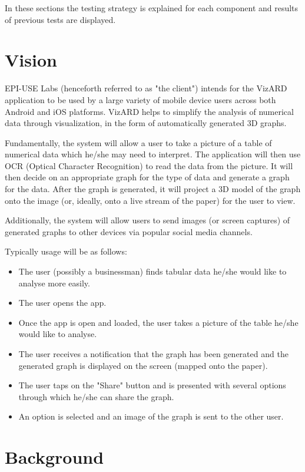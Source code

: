 \documentclass[a4paper,12pt]{article}
\begin{document}
In these sections the testing strategy is explained for each component and results of previous tests are displayed.

\newpage
\section{Vision}
EPI-USE Labs (henceforth referred to as "the client") intends for the VizARD application to be used by a large variety of mobile device users across both Android and iOS platforms. VizARD helps to simplify the analysis of numerical data through visualization, in the form of automatically generated 3D graphs.

Fundamentally, the system will allow a user to take a picture of a table of numerical data which he/she may need to interpret. The application will then use OCR (Optical Character Recognition) to read the data from the picture. It will then decide on an appropriate graph for the type of data and generate a graph for the data. After the graph is generated, it will project a 3D model of the graph onto the image (or, ideally, onto a live stream of the paper) for the user to view.

Additionally, the system will allow users to send images (or screen captures) of generated graphs to other devices via popular social media channels.

Typically usage will be as follows:
\begin{itemize}
	\item The user (possibly a businessman) finds tabular data he/she would like to analyse more easily.
	\item The user opens the app.
	\item Once the app is open and loaded, the user takes a picture of the table he/she would like to analyse.
	\item The user receives a notification that the graph has been generated and the generated graph is displayed on the screen (mapped onto the paper).
	\item The user taps on the "Share" button and is presented with several options through which he/she can share the graph.
	\item An option is selected and an image of the graph is sent to the other user.
\end{itemize}

\newpage
\section{Background}
\end{document}
